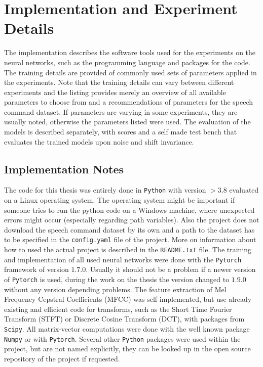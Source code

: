 
\section{Implementation and Experiment Details}\label{sec:exp_details}
\thesisStateNotReady
The implementation describes the software tools used for the experiments on the neural networks, such as the programming language and packages for the code.
The training details are provided of commonly used sets of parameters applied in the experiments.
Note that the training details can vary between different experiments and the listing provides merely an overview of all available parameters to choose from and a recommendations of parameters for the speech command dataset.
If parameters are varying in some experiments, they are usually noted, otherwise the parameters listed were used.
The evaluation of the models is described separately, with scores and a self made test bench that evaluates the trained models upon noise and shift invariance.



\subsection{Implementation Notes}\label{sec:exp_details_implementation}
The code for this thesis was entirely done in \texttt{Python} with version $>3.8$ evaluated on a Linux operating system.
The operating system might be important if someone tries to run the python code on a Windows machine, where unexpected errors might occur (especially regarding path variables).
Also the project does not download the speech command dataset by its own and a path to the dataset has to be specified in the \texttt{config.yaml} file of the project.
More on information about how to used the actual project is described in the \texttt{README.txt} file.
The training and implementation of all used neural networks were done with the \texttt{Pytorch} \cite{Pytorch} framework of version $1.7.0$. 
Usually it should not be a problem if a newer version of \texttt{Pytorch} is used, during the work on the thesis the version changed to $1.9.0$ without any version depending problems.
The feature extraction of Mel Frequency Cepstral Coefficients (MFCC) was self implemented, but use already existing and efficient code for transforms, such as the Short Time Fourier Transform (STFT) or Discrete Cosine Transform (DCT), with packages from \texttt{Scipy}.
All matrix-vector computations were done with the well known package \texttt{Numpy} or with \texttt{Pytorch}.
Several other \texttt{Python} packages were used within the project, but are not named explicitly, they can be looked up in the open source repository of the project if requested.


